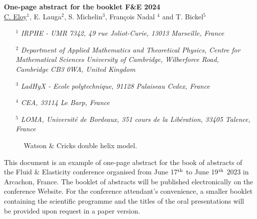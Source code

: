 \documentclass[a4,fullpage,twoside,12pt]{report}
\newcommand{\sst}[1]{\scriptscriptstyle{#1}}
\begin{document}
\setcounter{footnote}{0}
%
\vspace*{1.5cm}
\begin{center}
%
\textsf{\bfseries \Large One-page abstract for the booklet F\&E 2024}\\[5mm]
%
\large
\underline{C. Eloy$^{\sst 1}$}, E. Lauga$^{\sst 2}$, S. Michelin$^{\sst 3}$, Fran\c cois Nadal $^{4}$ and T. Bickel$^{5}$\\[5mm]%
%
\end{center}
\small
%
\begin{enumerate}
\item[$^{\sst 1}\!\!$]\emph{IRPHE - UMR 7342, 49 rue Joliot-Curie, 13013 Marseille, France}
\item[$^{\sst 2}\!\!$]\emph{Department of Applied Mathematics and Theoretical Physics, Centre for Mathematical Sciences
University of Cambridge, Wilberforce Road, Cambridge CB3 0WA, United Kingdom}
\item[$^{\sst 3}\!\!$]\emph{LadHyX - Ecole polytechnique, 91128 Palaiseau Cedex, France}
\item[$^{\sst 4}\!\!$]\emph{CEA, 33114 Le Barp, France}
\item[$^{\sst 5}\!\!$]\emph{LOMA, Universit\'e de Bordeaux, 351 cours de la Lib\'eration, 33405 Talence, France}\\[5mm]
\end{enumerate}
%
\normalsize
%
\begin{figure}
\vspace*{-12pt}
\caption*{Watson \& Cricks double helix model.\label{fig:O2}}
\vspace*{-12pt}
\end{figure}

This document is an example of one-page abstract for the book of abstracts
of the Fluid \& Elasticity conference organised from June 17$^{\mbox{\scriptsize th}}$ 
to June 19$^{\mbox{\scriptsize th}}$ 2023 in Arcachon, France.
The booklet of abstracts will be published electronically on the conference Website. 
For the conference attendant's convenience, a smaller booklet containing the scientific programme and 
the titles of the oral presentations will be provided upon request in a paper version.
\end{document}
